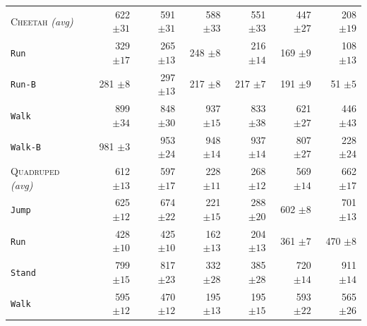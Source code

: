 \documentclass{article}
\theoremstyle{plain}
\theoremstyle{definition}
\theoremstyle{remark}
\begin{document}
\begin{table}
\begin{tabular}{l r r r r r r}
\rowcolor{gray!15}
\textsc{Cheetah} \textit{(avg)} & 622 ${\scriptstyle \pm 31}$ & 591 ${\scriptstyle \pm 31}$ & 588 ${\scriptstyle \pm 33}$ & 551 ${\scriptstyle \pm 33}$ & 447 ${\scriptstyle \pm 27}$ & 208 ${\scriptstyle \pm 19}$ \\
\hspace{.5em} \texttt{Run} & 329 ${\scriptstyle \pm 17}$ & 265 ${\scriptstyle \pm 13}$ & 248 ${\scriptstyle \pm 8}$ & 216 ${\scriptstyle \pm 14}$ & 169 ${\scriptstyle \pm 9}$ & 108 ${\scriptstyle \pm 13}$ \\
\hspace{.5em} \texttt{Run-B} & 281 ${\scriptstyle \pm 8}$ & 297 ${\scriptstyle \pm 13}$ & 217 ${\scriptstyle \pm 8}$ & 217 ${\scriptstyle \pm 7}$ & 191 ${\scriptstyle \pm 9}$ & 51 ${\scriptstyle \pm 5}$ \\
\hspace{.5em} \texttt{Walk} & 899 ${\scriptstyle \pm 34}$ & 848 ${\scriptstyle \pm 30}$ & 937 ${\scriptstyle \pm 15}$ & 833 ${\scriptstyle \pm 38}$ & 621 ${\scriptstyle \pm 27}$ & 446 ${\scriptstyle \pm 43}$ \\
\hspace{.5em} \texttt{Walk-B} & 981 ${\scriptstyle \pm 3}$ & 953 ${\scriptstyle \pm 24}$ & 948 ${\scriptstyle \pm 14}$ & 937 ${\scriptstyle \pm 14}$ & 807 ${\scriptstyle \pm 27}$ & 228 ${\scriptstyle \pm 24}$ \\
\addlinespace
\rowcolor{gray!15}
\textsc{Quadruped} \textit{(avg)} & 612 ${\scriptstyle \pm 13}$ & 597 ${\scriptstyle \pm 17}$ & 228 ${\scriptstyle \pm 11}$ & 268 ${\scriptstyle \pm 12}$ & 569 ${\scriptstyle \pm 14}$ & 662 ${\scriptstyle \pm 17}$ \\
\hspace{.5em} \texttt{Jump} & 625 ${\scriptstyle \pm 12}$ & 674 ${\scriptstyle \pm 22}$ & 221 ${\scriptstyle \pm 15}$ & 288 ${\scriptstyle \pm 20}$ & 602 ${\scriptstyle \pm 8}$ & 701 ${\scriptstyle \pm 13}$ \\
\hspace{.5em} \texttt{Run} & 428 ${\scriptstyle \pm 10}$ & 425 ${\scriptstyle \pm 10}$ & 162 ${\scriptstyle \pm 13}$ & 204 ${\scriptstyle \pm 13}$ & 361 ${\scriptstyle \pm 7}$ & 470 ${\scriptstyle \pm 8}$ \\
\hspace{.5em} \texttt{Stand} & 799 ${\scriptstyle \pm 15}$ & 817 ${\scriptstyle \pm 23}$ & 332 ${\scriptstyle \pm 28}$ & 385 ${\scriptstyle \pm 28}$ & 720 ${\scriptstyle \pm 14}$ & 911 ${\scriptstyle \pm 14}$ \\
\hspace{.5em} \texttt{Walk} & 595 ${\scriptstyle \pm 12}$ & 470 ${\scriptstyle \pm 12}$ & 195 ${\scriptstyle \pm 13}$ & 195 ${\scriptstyle \pm 15}$ & 593 ${\scriptstyle \pm 22}$ & 565 ${\scriptstyle \pm 26}$ \\

\end{tabular}
\end{table}
\end{document}
